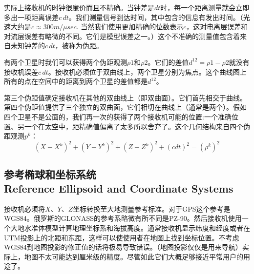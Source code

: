 	实际上接收机的时钟很廉价而且不精确。当钟差是$dt$时，每一个距离测量就会立即多出一项距离误差$c\,dt$。我们测量信号到达时间，其中包含的信息有发出时间。（光速大约是$c\approx300m/\mu sec.$ 当然我们使用更加精确的位数表示$c$，这对电离层误差和对流层误差有略微的不同。它们是模型误差之一。）这个不准确的测量值包含着来自未知钟差的$c\,dt$，被称为伪距。
	
	有两个卫星时我们可以获得两个伪距观测$\rho 1$和$\rho 2$。它们的差值$d^{12}=\rho 1 - \rho 2$就没有接收机误差$c\,dt$。接收机必须位于双曲线上，两个卫星分别为焦点。这个曲线图上所有的点在空间中的距离到两个卫星的差值都是$d^{12}$。
	
	第三个伪距值确定接收机在其他的双曲线上（即双曲面）。它们首先相交于曲线。第四个伪距值提供了三个独立的双曲面，它们相切在曲线上（通常是两个）。假如四个卫星不是公面的，我们再一次的获得了两个接收机可能的位置:一个准确位置、另一个在太空中，距精确值偏离了太多所以舍弃了。这个几何结构来自四个伪距观测$p^{k}$：
	\[ (X-X^{k})^{2}+(Y-Y^{k})^{2}+(Z-Z^{k})^{2}+(c dt)^{2}=(\rho ^{k})^{2} \]
	
	\subsection[参考椭球和坐标系统]{参考椭球和坐标系统\\Reference Ellipsoid and Coordinate Systems}
	接收机必须将$X$、$Y$、$Z$坐标转换至大地测量参考标准。对于GPS这个参考是WGS84。俄罗斯的GLONASS的参考系略微有所不同是PZ-90。然后接收机使用一个大地水准体模型计算地理坐标系和海拔高度。通常接收机显示纬度和经度或者在UTM投影上的北距和东距，这样可以使使用者在地图上找到坐标位置。不考虑WGS84到地图投影的修正值的话将极易导致错误。（地图投影仅仅是用来导航）实际上，地图不太可能达到厘米级的精度。尽管如此它们大概足够接近平常用户的用途了。
	\newpage